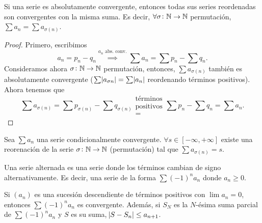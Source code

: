 \begin{prop}
    Si una serie es absolutamente convergente, entonces todas sus series reordenadas
    son convergentes con la misma suma. Es decir, $\forall \sigma \colon \mathbb{N} \to \mathbb{N}$
    permutación, $\sum a_n = \sum a_{\sigma(n)}$.
\end{prop}

\begin{proof}
    Primero, escribimos
    \[
        a_n = p_n - q_n \stackrel{\text{$a_n$ abs. conv.}}{\implies}
        \sum a_n = \sum p_n - \sum q_n.
    \]
    Consideramos ahora $\sigma \colon \mathbb{N} \to \mathbb{N}$ permutación, entonces, $\sum a_{\sigma(n)}$
    también es absolutamente convergente ($\sum \abs{a_{\sigma{n}}} = \sum \abs{a_n}$
    reordenando términos positivos). Ahora tenemos que
    \[
        \sum a_{\sigma(n)} = \sum p_{\sigma(n)} - \sum q_{\sigma(n)}
        \substack{\text{términos} \\ \text{positivos} \\ =} \sum p_n - \sum q_n = \sum a_n.
    \]
\end{proof}

\begin{teo}
    Sea $\sum a_n$ una serie condicionalmente convergente. $\forall s \in [-\infty,+\infty]$
    existe una reorenación de la serie $\sigma \colon \mathbb{N} \to \mathbb{N}$ (permutación) tal que
    $\sum a_{\sigma(n)} = s$.
\end{teo}

\begin{defi}
    Una serie alternada es una serie donde los términos cambian de signo alternativamente.
    Es decir, una serie de la forma $\sum (-1)^n a_n$ donde $a_n \geq 0$.
\end{defi}

\begin{prop}
    Si $(a_n)$ es una sucesión descendiente de términos positivos con $\lim a_n = 0$,
    entonces  $\sum (-1)^n a_n$ es convergente. Además, si $S_N$ es la $N$-ésima suma
    parcial de $\sum (-1)^n a_n$ y $S$ es su suma, $\abs{S - S_n} \leq a_{n+1}$.
\end{prop}

